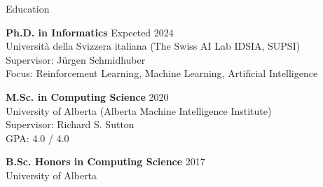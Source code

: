 \documentclass{cv}
\begin{document}

\begin{rSection}{Education}

{\bf Ph.D. in Informatics} \hfill Expected 2024 \vspace{0.05em}\\
Universit{\`{a}} della Svizzera italiana (The Swiss AI Lab IDSIA, SUPSI) \vspace{0.05em}\\
Supervisor: J{\"u}rgen Schmidhuber \vspace{0.05em}\\
Focus: Reinforcement Learning, Machine Learning, Artificial Intelligence


{\bf M.Sc. in Computing Science} \hfill 2020 \vspace{0.05em}\\
University of Alberta (Alberta Machine Intelligence Institute) \vspace{0.05em}\\
Supervisor: Richard S. Sutton \vspace{0.05em}\\
GPA: 4.0 / 4.0


{\bf B.Sc. Honors in Computing Science} \hfill 2017 \vspace{0.05em}\\
University of Alberta

\end{rSection}

\end{document}
